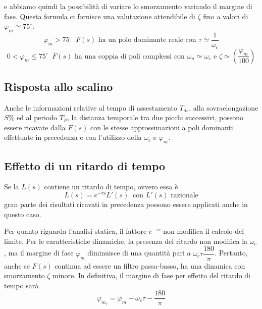 \documentclass[a4paper]{report}
\begin{document}
e abbiamo quindi la possibilit\`a di variare lo smorzamento variando il
margine di fase. Questa formula ci fornisce una valutazione
attendibile di $\zeta$ fino a valori di $\varphi_m \simeq
75^{\circ}$:
\[
\varphi_m > 75^{\circ} \;\; F(s) \textrm{ ha un polo dominante reale
  con } \tau \simeq \dfrac{1}{\omega_c}
\]
\[
0 < \varphi_m \leq 75^{\circ} \;\; F(s) \textrm{ ha una coppia di poli
complessi con } \omega_n \simeq \omega_c \textrm{ e } \zeta \simeq
\left(\dfrac{\varphi_m}{100}\right) 
\]

\subsection{Risposta allo scalino}
Anche le informazioni relative al tempo di assestamento $T_{a
  \varepsilon}$, alla sovraelongazione $S\%$ ed al periodo $T_P$, la
distanza temporale tra due picchi successivi, possono essere ricavate
dalla $F(s)$ con le stesse approssimazioni a poli dominanti effettuate
in precedenza e con l'utilizzo della $\omega_c$ e $\varphi_m$.

\subsection{Effetto di un ritardo di tempo}
Se la $L(s)$ contiene un ritardo di tempo, ovvero essa \`e
\[
L(s) = e^{-\tau s} L'(s) \;\; \textrm{con $L'(s)$ razionale}
\]
gran parte dei risultati ricavati in precedenza possono essere
applicati anche in questo caso.

Per quanto riguarda l'analisi statica, il fattore $e^{- \tau s}$ non
modifica il calcolo del limite. Per le caratteristiche dinamiche, la
presenza del ritardo non modifica la $\omega_c$, ma il margine di fase
$\varphi_m$ diminuisce di una quantit\`a pari a $\omega_c \tau
\dfrac{180}{\pi}$. Pertanto, anche se $F(s)$ continua ad essere un
filtro passa-basso, ha una dinamica con smorzamento $\zeta$ minore. In
definitiva, il margine di fase per effetto del ritardo di tempo
sar\`a
\[
\varphi_{m_{\tau}} = \varphi_m - \omega_c \tau - \dfrac{180}{\pi}
\]

\end{document}
